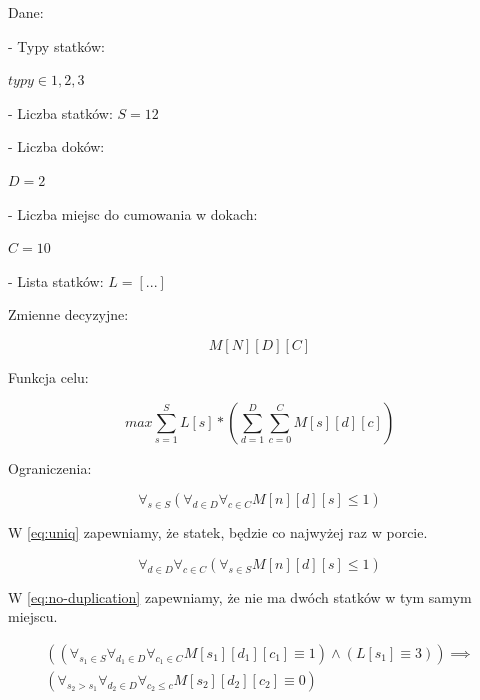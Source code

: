 Dane:

- Typy statków:

\(typy \in {1,2,3}\)

- Liczba statków:
\(S = 12\)

- Liczba doków:

\(D = 2\)

- Liczba miejsc do cumowania w dokach:

\(C=10\)

- Lista statków:
\(L=[...]\)

Zmienne decyzyjne:

\begin{equation}
    M[N][D][C]
\end{equation}


Funkcja celu:

\begin{equation}
    max \sum_{s=1}^{S} L[s] * (\sum_{d=1}^{D} \sum_{c=0}^{C} M[s][d][c])
\end{equation}


Ograniczenia:

\begin{equation} \label{eq:uniq}
    \forall_{s\in S} ( \forall_{d\in D}\forall_{c \in C} M[n][d][s] \leq 1 )
\end{equation}

W \ref{eq:uniq} zapewniamy, że statek, będzie co najwyżej raz w porcie. 

\begin{equation} \label{eq:no-duplication}
    \forall_{d\in D}\forall_{c \in C} (\forall_{s \in S} M[n][d][s] \leq 1)
\end{equation}

W \ref{eq:no-duplication} zapewniamy, że nie ma dwóch statków w tym samym miejscu.

\begin{equation} \label{eq:3jka-blokuje}
    \begin{split}
        ((\forall_{s_1\in S}\forall_{d_1\in D}\forall_{c_1 \in C} M[s_1][d_1][c_1] \equiv 1) \land (L[s_1] \equiv 3 )) \implies  \\
    (\forall_{s_2>s_1} \forall_{d_2 \in D} \forall_{c_2 \leq c} M[s_2][d_2][c_2] \equiv 0)
    \end{split}
\end{equation}


